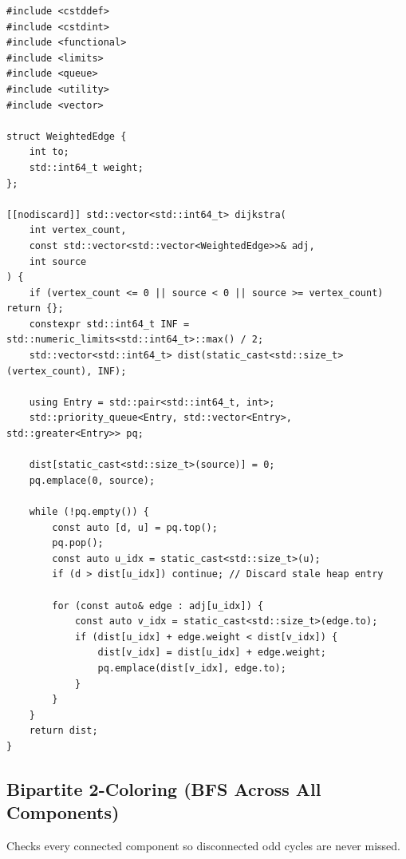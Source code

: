 \documentclass[11pt,a4paper]{article}
\theoremstyle{definition}
\begin{document}
\begin{lstlisting}[caption={Overflow-safe Dijkstra's algorithm using 64-bit distances}]
#include <cstddef>
#include <cstdint>
#include <functional>
#include <limits>
#include <queue>
#include <utility>
#include <vector>

struct WeightedEdge {
    int to;
    std::int64_t weight;
};

[[nodiscard]] std::vector<std::int64_t> dijkstra(
    int vertex_count,
    const std::vector<std::vector<WeightedEdge>>& adj,
    int source
) {
    if (vertex_count <= 0 || source < 0 || source >= vertex_count) return {};
    constexpr std::int64_t INF = std::numeric_limits<std::int64_t>::max() / 2;
    std::vector<std::int64_t> dist(static_cast<std::size_t>(vertex_count), INF);

    using Entry = std::pair<std::int64_t, int>;
    std::priority_queue<Entry, std::vector<Entry>, std::greater<Entry>> pq;

    dist[static_cast<std::size_t>(source)] = 0;
    pq.emplace(0, source);

    while (!pq.empty()) {
        const auto [d, u] = pq.top();
        pq.pop();
        const auto u_idx = static_cast<std::size_t>(u);
        if (d > dist[u_idx]) continue; // Discard stale heap entry

        for (const auto& edge : adj[u_idx]) {
            const auto v_idx = static_cast<std::size_t>(edge.to);
            if (dist[u_idx] + edge.weight < dist[v_idx]) {
                dist[v_idx] = dist[u_idx] + edge.weight;
                pq.emplace(dist[v_idx], edge.to);
            }
        }
    }
    return dist;
}
\end{lstlisting}

\subsection{Bipartite 2-Coloring (BFS Across All Components)}
Checks every connected component so disconnected odd cycles are never missed.
\end{document}
